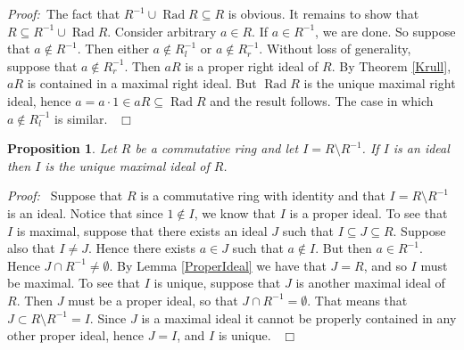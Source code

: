 \documentclass[12pt, oneside]{book}
\newtheorem{proposition}[theorem]{Proposition}
\newcommand{\proof}{{\noindent \it Proof:~}}
\newcommand{\qed}{\hfill ~$\Box$\\}
\def\Rad{\operatorname{Rad}}
\begin{document}
\proof \space The fact that $R^{-1} \cup \Rad R \subseteq R$ is obvious. It remains to show that $R \subseteq R^{-1} \cup \Rad R$. Consider arbitrary $a \in R$. If $a \in R^{-1}$, we are done. So suppose that $a \not \in R^{-1}$. 
Then either $a \not \in R_l^{-1}$ or $a \not \in R_r^{-1}$. Without loss of generality, suppose that $a \not \in R_r^{-1}$. 
Then $a R$ is a proper right ideal of $R$. By Theorem \ref{Krull}, $a R$ is contained in a maximal right ideal. But $\Rad R$ is the unique maximal right ideal, hence $a=a \cdot 1 \in a R \subseteq \Rad R$ and the result follows. The case in which $a \not \in R_l^{-1}$ is similar. \qed

\begin{proposition} \label{UniqueMaxIdeal}
\normalfont
\noindent Let $R$ be a commutative ring and let $I = R \setminus R^{-1}$. 
If $I$ is an ideal then $I$ is the unique maximal ideal of $R$.
\end{proposition}
\proof \space
\noindent Suppose that $R$ is a commutative ring with identity and that 
$I = R \setminus R^{-1}$ is an ideal. Notice that since $1 \notin I$, 
we know that $I$ is a proper ideal. To see that $I$ is maximal, suppose that there exists 
an ideal $J$ such that $I \subseteq J \subseteq R$. Suppose also that 
$I \neq J$. Hence there exists $a \in J$ such that $a \notin I.$ But then $a \in R^{-1}$. 
Hence $J \cap R^{-1} \neq \emptyset$. By Lemma \ref{ProperIdeal} we have that $J = R$, and so 
$I$ must be maximal.
\vskip 0.3cm
\noindent To see that $I$ is unique, suppose that $J$ is another maximal ideal of $R$. 
Then $J$ must be a proper ideal, so that $J \cap R^{-1} = \emptyset$. 
That means that $J \subset R \setminus R^{-1} = I$. 
Since $J$ is a maximal ideal it cannot be properly contained in any other proper ideal, 
hence $J = I$, and $I$ is unique. \qed
\end{document}
